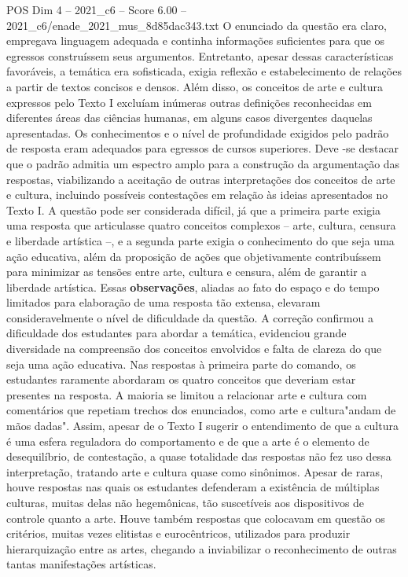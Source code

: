 \begin{textsample}{POS Dim 4 – 2021\_c6 – Score 6.00 – 2021\_c6/enade\_2021\_mus\_8d85dac343.txt}
O enunciado da questão era claro, empregava linguagem adequada e continha informações suficientes para que os egressos construíssem seus argumentos.
Entretanto, apesar dessas características favoráveis, a temática era sofisticada, exigia reflexão e estabelecimento de relações a partir de textos concisos e densos.
Além disso, os conceitos de arte e cultura expressos pelo Texto I excluíam inúmeras outras definições reconhecidas em diferentes áreas das ciências humanas, em alguns casos divergentes daquelas apresentadas.
Os conhecimentos e o nível de profundidade exigidos pelo padrão de resposta eram adequados para egressos de cursos superiores.
Deve -se destacar que o padrão admitia um espectro amplo para a construção da argumentação das respostas, viabilizando a aceitação de outras interpretações dos conceitos de arte e cultura, incluindo possíveis contestações em relação às ideias apresentados no Texto I.
A questão pode ser considerada difícil, já que a primeira parte exigia uma resposta que articulasse quatro conceitos complexos – arte, cultura, censura e liberdade artística –, e a segunda parte exigia o conhecimento do que seja uma ação educativa, além da proposição de ações que objetivamente contribuíssem para minimizar as tensões entre arte, cultura e censura, além de garantir a liberdade artística.
Essas \textbf{observações}, aliadas ao fato do espaço e do tempo limitados para elaboração de uma resposta tão extensa, elevaram consideravelmente o nível de dificuldade da questão.
A correção confirmou a dificuldade dos estudantes para abordar a temática, evidenciou grande diversidade na compreensão dos conceitos envolvidos e falta de clareza do que seja uma ação educativa.
Nas respostas à primeira parte do comando, os estudantes raramente abordaram os quatro conceitos que deveriam estar presentes na resposta.
A maioria se limitou a relacionar arte e cultura com comentários que repetiam trechos dos enunciados, como arte e cultura"andam de mãos dadas".
Assim, apesar de o Texto I sugerir o entendimento de que a cultura é uma esfera reguladora do comportamento e de que a arte é o elemento de desequilíbrio, de contestação, a quase totalidade das respostas não fez uso dessa interpretação, tratando arte e cultura quase como sinônimos.
Apesar de raras, houve respostas nas quais os estudantes defenderam a existência de múltiplas culturas, muitas delas não hegemônicas, tão suscetíveis aos dispositivos de controle quanto a arte.
Houve também respostas que colocavam em questão os critérios, muitas vezes elitistas e eurocêntricos, utilizados para produzir hierarquização entre as artes, chegando a inviabilizar o reconhecimento de outras tantas manifestações artísticas.

\end{textsample}
